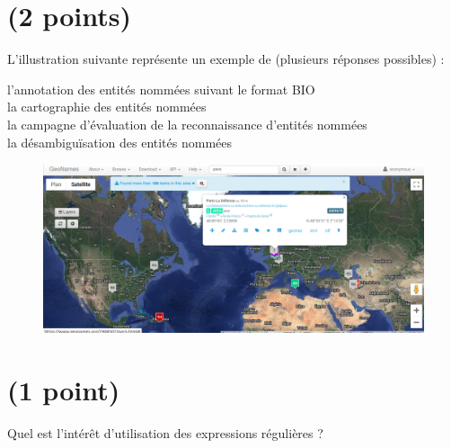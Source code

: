 \documentclass[UKenglish]{uioexam}
\begin{document}
\section[Acquisition]{\small(2 points)}
L’illustration suivante représente un exemple de (plusieurs réponses possibles) :
\begin{choicelist}[]
   \makebox[0pt][l]{$\square$} l’annotation des entités nommées suivant le format \textsc{BIO}\\

    \makebox[0pt][l]{$\square$}\raisebox{0.15ex}{\hspace{0.1em}$\checkmark$}
    la cartographie des entités nommées\\

    \makebox[0pt][l]{$\square$}
    la campagne d’évaluation de la reconnaissance d’entités nommées\\

   \makebox[0pt][l]{$\square$}\raisebox{0.15ex}{\hspace{0.1em}$\checkmark$} la désambiguïsation des entités nommées
   
   \begin{figure}[H]
    \centering
    \includegraphics[width=1\textwidth]{img/geonames.png}
    \label{fig:mesh1}
\end{figure}


\end{choicelist}

\section[Regex_2]{\small(1 point)}
Quel est l’intérêt d’utilisation des expressions régulières ?\\

\end{document}
